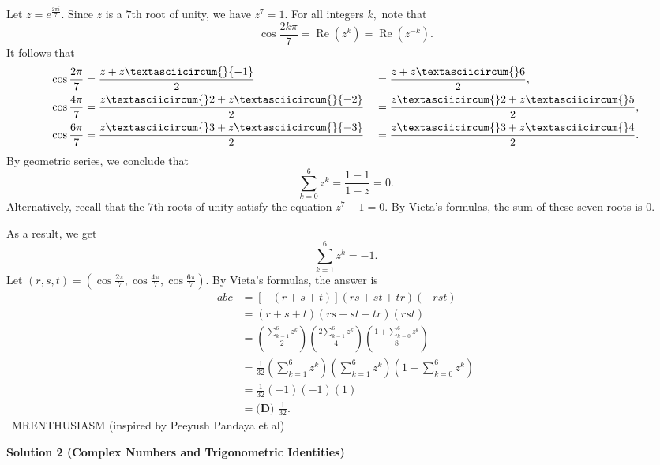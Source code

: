 \begin{enumerate}
Let $z=e^{\frac{2\pi i}{7}}.$ Since $z$ is a $7$th root of unity, we have $z^7=1.$ For all integers $k,$ note that 
 \[\cos\frac{2k\pi}{7}=\operatorname{Re}\left(z^k\right)=\operatorname{Re}\left(z^{-k}\right).\]It follows that
 \begin{alignat*}{4} \cos\frac{2\pi}{7} &= \frac{z+z\textasciicircum{}{-1}}{2} &&= \frac{z+z\textasciicircum{}6}{2}, \\ \cos\frac{4\pi}{7} &= \frac{z\textasciicircum{}2+z\textasciicircum{}{-2}}{2} &&= \frac{z\textasciicircum{}2+z\textasciicircum{}5}{2}, \\ \cos\frac{6\pi}{7} &= \frac{z\textasciicircum{}3+z\textasciicircum{}{-3}}{2} &&= \frac{z\textasciicircum{}3+z\textasciicircum{}4}{2}. \end{alignat*}By geometric series, we conclude that 
 \[\sum_{k=0}^{6}z^k=\frac{1-1}{1-z}=0.\]Alternatively, recall that the $7$th roots of unity satisfy the equation $z^7-1=0.$ By Vieta's formulas, the sum of these seven roots is $0.$

 As a result, we get 
 \[\sum_{k=1}^{6}z^k=-1.\]Let $(r,s,t)=\left(\cos{\frac{2\pi}{7}},\cos{\frac{4\pi}{7}},\cos{\frac{6\pi}{7}}\right).$ By Vieta's formulas, the answer is
 \begin{align*} abc&=[-(r+s+t)](rs+st+tr)(-rst) \\ &=(r+s+t)(rs+st+tr)(rst) \\ &=\left(\frac{\sum_{k=1}^{6}z^k}{2}\right)\left(\frac{2\sum_{k=1}^{6}z^k}{4}\right)\left(\frac{1+\sum_{k=0}^{6}z^k}{8}\right) \\ &=\frac{1}{32}\left(\sum_{k=1}^{6}z^k\right)\left(\sum_{k=1}^{6}z^k\right)\left(1+\sum_{k=0}^{6}z^k\right) \\ &=\frac{1}{32}(-1)(-1)(1) \\ &=\boxed{\textbf{(D) }\frac{1}{32}}. \end{align*}
~MRENTHUSIASM (inspired by Peeyush Pandaya et al)

 



\textbf{Solution 2 (Complex Numbers and Trigonometric Identities)}


\end{enumerate}
